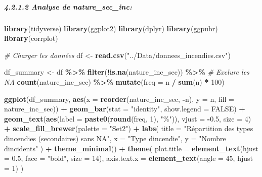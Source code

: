 \documentclass[
]{article}
\newenvironment{Shaded}{\begin{snugshade}}{\end{snugshade}}
\newcommand{\AttributeTok}[1]{\textcolor[rgb]{0.13,0.29,0.53}{#1}}
\newcommand{\CommentTok}[1]{\textcolor[rgb]{0.56,0.35,0.01}{\textit{#1}}}
\newcommand{\ConstantTok}[1]{\textcolor[rgb]{0.56,0.35,0.01}{#1}}
\newcommand{\DecValTok}[1]{\textcolor[rgb]{0.00,0.00,0.81}{#1}}
\newcommand{\FloatTok}[1]{\textcolor[rgb]{0.00,0.00,0.81}{#1}}
\newcommand{\FunctionTok}[1]{\textcolor[rgb]{0.13,0.29,0.53}{\textbf{#1}}}
\newcommand{\NormalTok}[1]{#1}
\newcommand{\OtherTok}[1]{\textcolor[rgb]{0.56,0.35,0.01}{#1}}
\newcommand{\SpecialCharTok}[1]{\textcolor[rgb]{0.81,0.36,0.00}{\textbf{#1}}}
\newcommand{\StringTok}[1]{\textcolor[rgb]{0.31,0.60,0.02}{#1}}
\begin{document}
\subparagraph{4.2.1.2 Analyse de
nature\_sec\_inc:}\label{analyse-de-nature_sec_inc}

\begin{Shaded}
\begin{Highlighting}[]
\FunctionTok{library}\NormalTok{(tidyverse)}
\FunctionTok{library}\NormalTok{(ggplot2)}
\FunctionTok{library}\NormalTok{(dplyr)}
\FunctionTok{library}\NormalTok{(ggpubr)}
\FunctionTok{library}\NormalTok{(corrplot)}

\CommentTok{\# Charger les données}
\NormalTok{df }\OtherTok{\textless{}{-}} \FunctionTok{read.csv}\NormalTok{(}\StringTok{"../Data/donnees\_incendies.csv"}\NormalTok{)}

\NormalTok{df\_summary }\OtherTok{\textless{}{-}}\NormalTok{ df }\SpecialCharTok{\%\textgreater{}\%} 
  \FunctionTok{filter}\NormalTok{(}\SpecialCharTok{!}\FunctionTok{is.na}\NormalTok{(nature\_inc\_sec)) }\SpecialCharTok{\%\textgreater{}\%}  \CommentTok{\# Exclure les NA}
  \FunctionTok{count}\NormalTok{(nature\_inc\_sec) }\SpecialCharTok{\%\textgreater{}\%}
  \FunctionTok{mutate}\NormalTok{(}\AttributeTok{freq =}\NormalTok{ n }\SpecialCharTok{/} \FunctionTok{sum}\NormalTok{(n) }\SpecialCharTok{*} \DecValTok{100}\NormalTok{)}

\FunctionTok{ggplot}\NormalTok{(df\_summary, }\FunctionTok{aes}\NormalTok{(}\AttributeTok{x =} \FunctionTok{reorder}\NormalTok{(nature\_inc\_sec, }\SpecialCharTok{{-}}\NormalTok{n), }\AttributeTok{y =}\NormalTok{ n, }\AttributeTok{fill =}\NormalTok{ nature\_inc\_sec)) }\SpecialCharTok{+} 
  \FunctionTok{geom\_bar}\NormalTok{(}\AttributeTok{stat =} \StringTok{"identity"}\NormalTok{, }\AttributeTok{show.legend =} \ConstantTok{FALSE}\NormalTok{) }\SpecialCharTok{+}
  \FunctionTok{geom\_text}\NormalTok{(}\FunctionTok{aes}\NormalTok{(}\AttributeTok{label =} \FunctionTok{paste0}\NormalTok{(}\FunctionTok{round}\NormalTok{(freq, }\DecValTok{1}\NormalTok{), }\StringTok{"\%"}\NormalTok{)), }\AttributeTok{vjust =} \SpecialCharTok{{-}}\FloatTok{0.5}\NormalTok{, }\AttributeTok{size =} \DecValTok{4}\NormalTok{) }\SpecialCharTok{+}
  \FunctionTok{scale\_fill\_brewer}\NormalTok{(}\AttributeTok{palette =} \StringTok{"Set2"}\NormalTok{) }\SpecialCharTok{+}
  \FunctionTok{labs}\NormalTok{(}
    \AttributeTok{title =} \StringTok{"Répartition des types d\textquotesingle{}incendies (secondaires) sans NA"}\NormalTok{, }
    \AttributeTok{x =} \StringTok{"Type d\textquotesingle{}incendie"}\NormalTok{,}
    \AttributeTok{y =} \StringTok{"Nombre d\textquotesingle{}incidents"}
\NormalTok{  ) }\SpecialCharTok{+}
  \FunctionTok{theme\_minimal}\NormalTok{() }\SpecialCharTok{+}
  \FunctionTok{theme}\NormalTok{(}
    \AttributeTok{plot.title =} \FunctionTok{element\_text}\NormalTok{(}\AttributeTok{hjust =} \FloatTok{0.5}\NormalTok{, }\AttributeTok{face =} \StringTok{"bold"}\NormalTok{, }\AttributeTok{size =} \DecValTok{14}\NormalTok{),}
    \AttributeTok{axis.text.x =} \FunctionTok{element\_text}\NormalTok{(}\AttributeTok{angle =} \DecValTok{45}\NormalTok{, }\AttributeTok{hjust =} \DecValTok{1}\NormalTok{)}
\NormalTok{  )}
\end{Highlighting}
\end{Shaded}
\end{document}
